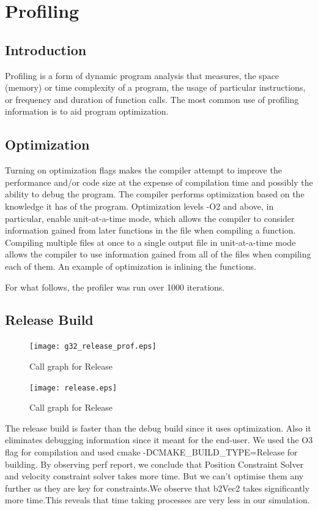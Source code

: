 \documentclass[11pt]{article}
\begin{document}
\section{Profiling}
\subsection{Introduction}

Profiling \cite{ref1} is a form of dynamic program analysis that measures, the space (memory) or time complexity of a program, the usage of particular instructions, or frequency and duration of function calls. The most common use of profiling information is to aid program optimization.

\subsection{Optimization}
Turning on optimization flags makes the compiler attempt to improve the performance and/or code size at the expense of compilation time and possibly the ability to debug the program. The compiler performs optimization based on the knowledge it has of the program. Optimization levels -O2 and above, in particular, enable unit-at-a-time mode, which allows the compiler to consider information gained from later functions in the file when compiling a function. Compiling multiple files at once to a single output file in unit-at-a-time mode allows the compiler to use information gained from all of the files when compiling each of them. An example of optimization is inlining the functions.

For what follows, the profiler was run over 1000 iterations.

\subsection{Release Build}


\begin{figure}[ht!]
\centering
\texttt{[image: g32\_release\_prof.eps]}
\caption{Call graph for Release}
\label{overflow}
\end{figure}

\begin{figure}[ht!]
\centering
\texttt{[image: release.eps]}
\caption{Call graph for Release}
\label{overflow}
\end{figure}

The release build is faster than the debug build since it uses optimization. Also it eliminates debugging information since it meant for the end-user. We used the O3 flag for compilation and used cmake -DCMAKE\_BUILD\_TYPE=Release for building.
By observing perf report, we conclude that Position Constraint Solver and velocity constraint solver takes more time. But we can't optimise them any further as they are key for constraints.We observe that b2Vec2 takes significantly more time.This reveals that time taking processes are very less in our simulation. 


\end{document}
